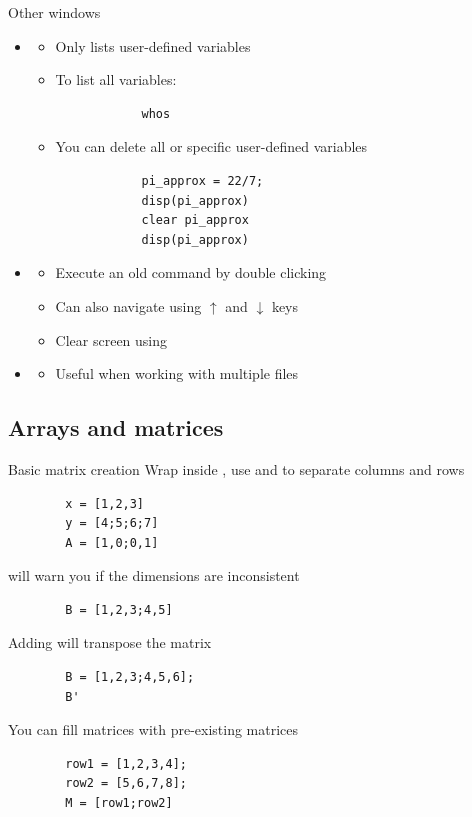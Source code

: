 \begin{frame}[fragile]{Other \scilab{} windows}
\begin{itemize}
    \item {}
    \begin{itemize}
        \item Only lists user-defined variables
        \item To list all variables:
        \begin{lstlisting}
            whos
        \end{lstlisting}
        \item You can delete all or specific user-defined variables
        \begin{lstlisting}
            pi_approx = 22/7;
            disp(pi_approx)
            clear pi_approx
            disp(pi_approx)
        \end{lstlisting}
    \end{itemize}
    \item {}
    \begin{itemize}
        \item Execute an old command by double clicking
        \item Can also navigate using $\uparrow$ and $\downarrow$ keys
        \item Clear screen using 
    \end{itemize}
    \item {}
    \begin{itemize}
        \item Useful when working with multiple files
    \end{itemize}
\end{itemize}
\end{frame}

\subsection{Arrays and matrices}
\begin{frame}[fragile]{Basic matrix creation}
    Wrap inside \inlinecode{[]}, use \inlinecode{,} and \inlinecode{;} to separate columns and rows
    \begin{lstlisting}
        x = [1,2,3]
        y = [4;5;6;7]
        A = [1,0;0,1]
    \end{lstlisting}
    \scilab{} will warn you if the dimensions are inconsistent
    \begin{lstlisting}
        B = [1,2,3;4,5]
    \end{lstlisting}
    Adding  will transpose the matrix
    \begin{lstlisting}
        B = [1,2,3;4,5,6];
        B'
    \end{lstlisting}
    You can fill matrices with pre-existing matrices
    \begin{lstlisting}
        row1 = [1,2,3,4];
        row2 = [5,6,7,8];
        M = [row1;row2]
    \end{lstlisting}
\end{frame}

